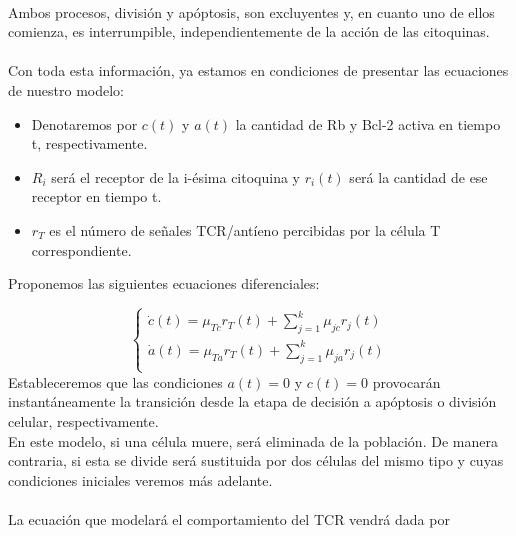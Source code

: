 \documentclass{article}
\begin{document}
	\\
	Ambos procesos, división y apóptosis, son excluyentes y, en cuanto uno de ellos comienza, es interrumpible, independientemente de la acción de las citoquinas. 
	\\
	\\
	Con toda esta información, ya estamos en condiciones de presentar las ecuaciones de nuestro modelo: 
	\begin{itemize}
	    \item Denotaremos por \textit{$c(t)$} y \textit{$a(t)$} la cantidad de Rb y Bcl-2 activa en tiempo t, respectivamente.
	    \item \textit{$R_{i}$} será el receptor de la i-ésima citoquina y \textit{$r_{i}(t)$} será la cantidad de ese receptor en tiempo t. 
	    \item $r_{T}$ es el número de señales TCR/antíeno  percibidas por la célula T correspondiente.
	\end{itemize} 
	 Proponemos las siguientes ecuaciones diferenciales:
	 
	 \begin{displaymath}
         \left\{ \begin{array}{l}
        \dot{c}(t) = \mu_{Tc}r_{T}(t) + \sum_{j=1}^{k}\mu_{jc}r_{j}(t)\\
        \dot{a}(t) = \mu_{Ta}r_{T}(t) + \sum_{j=1}^{k}\mu_{ja}r_{j}(t) \\
        \end{array}
        \right.
    \end{displaymath}
    Estableceremos que las condiciones $a(t)=0$ y $c(t)=0$ provocarán instantáneamente la transición desde la etapa de decisión a apóptosis o división celular, respectivamente.
	\\
	En este modelo, si una célula muere, será eliminada de la población. De manera contraria, si esta se divide será sustituida por dos células del mismo tipo y cuyas condiciones iniciales veremos más adelante.
	\\
	\\
	La ecuación que modelará el comportamiento del TCR vendrá dada por 
\end{document}
